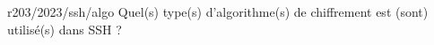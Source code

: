 \begin{question}{r203/2023/ssh/algo}
  Quel(s) type(s) d'algorithme(s) de chiffrement est (sont) utilisé(s)
  dans SSH ?
  \begin{reponses}[2]
  \end{reponses}
\end{question}

